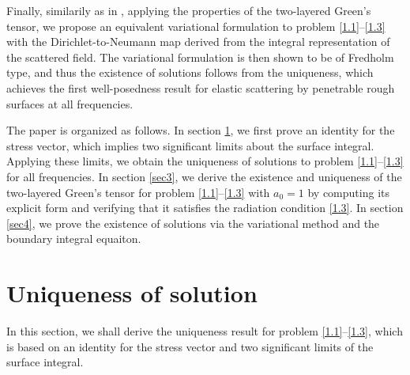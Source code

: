 \documentclass[final,reqno]{siamltex}
\begin{document}
Finally, similarily as in \cite{GGT18,GXY18}, applying the properties of the two-layered Green's tensor, we propose an equivalent variational formulation to problem \eqref{1.1}--\eqref{1.3} with the Dirichlet-to-Neumann map derived from the integral representation of the scattered field. The variational formulation is then shown to be of Fredholm type, and thus the existence of solutions follows from the uniqueness, which achieves the first well-posedness result for elastic scattering by penetrable rough surfaces at all frequencies. 

The paper is organized as follows. In section \ref{sec2}, we first prove an identity for the stress vector, which implies two significant limits about the surface integral. Applying these limits, we obtain the uniqueness of solutions to problem \eqref{1.1}--\eqref{1.3} for all frequencies. In section \ref{sec3}, we derive the existence and uniqueness of the two-layered Green's tensor for problem \eqref{1.1}--\eqref{1.3} with $a_0=1$ by computing its explicit form and verifying that it satisfies the radiation condition \eqref{1.3}. In section \ref{sec4}, we prove the existence of solutions via the variational method and the boundary integral equaiton. 







\section{Uniqueness of solution}\label{sec2}
\setcounter{equation}{0}
In this section, we shall derive the uniqueness result for problem \eqref{1.1}--\eqref{1.3}, which is based on an identity for the stress vector and two significant limits of the surface integral. 
\end{document}
